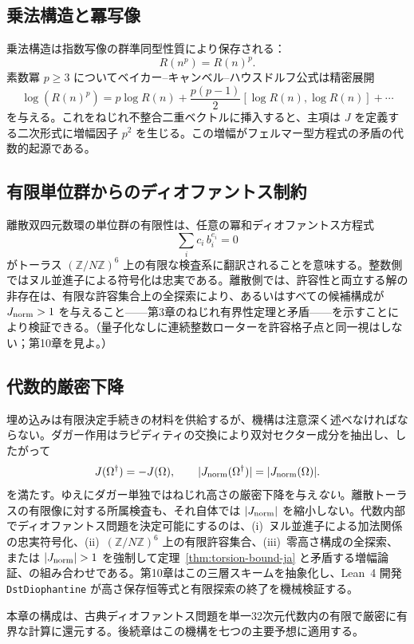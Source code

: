 \documentclass[dvipdfmx,a4paper]{article}
\theoremstyle{definition}
\theoremstyle{remark}
\newcommand{\Jnorm}{J_{\rm norm}}
\begin{document}
\subsection{乗法構造と冪写像}

乗法構造は指数写像の群準同型性質により保存される：
\[
R(n^p) = R(n)^p.
\]
素数冪 $p \geq 3$ についてベイカー--キャンベル--ハウスドルフ公式は精密展開
\[
\log(R(n)^p) = p \log R(n) + \frac{p(p-1)}{2} [\log R(n), \log R(n)] + \cdots
\]
を与える。これをねじれ不整合二重ベクトルに挿入すると、主項は $J$ を定義する二次形式に増幅因子 $p^2$ を生じる。この増幅がフェルマー型方程式の矛盾の代数的起源である。

\subsection{有限単位群からのディオファントス制約}

離散双四元数環の単位群の有限性は、任意の冪和ディオファントス方程式
\[
\sum_i c_i\, b_i^{e_i} = 0
\]
がトーラス $(\mathbb{Z}/N\mathbb{Z})^6$ 上の有限な検査系に翻訳されることを意味する。整数側ではヌル並進子による符号化は忠実である。離散側では、許容性と両立する解の非存在は、有限な許容集合上の全探索により、あるいはすべての候補構成が $\Jnorm > 1$ を与えること——第3章のねじれ有界性定理と矛盾——を示すことにより検証できる。（量子化なしに連続整数ローターを許容格子点と同一視はしない；第10章を見よ。）


\subsection{代数的厳密下降}

\label{sec:ch4-descent-ja}
埋め込みは有限決定手続きの材料を供給するが、機構は注意深く述べなければならない。ダガー作用はラピディティの交換により双対セクター成分を抽出し、したがって
\[
J(\Omega^\dagger)=-J(\Omega),\qquad |\Jnorm(\Omega^\dagger)|=|\Jnorm(\Omega)|.
\]
を満たす。ゆえにダガー単独ではねじれ高さの厳密下降を与え\emph{ない}。離散トーラスの有限像に対する所属検査も、それ自体では $|\Jnorm|$ を縮小しない。代数内部でディオファントス問題を決定可能にするのは、(i)~ヌル並進子による加法関係の忠実符号化、(ii)~$(\mathbb{Z}/N\mathbb{Z})^6$ 上の有限許容集合、(iii)~零高さ構成の全探索、または $|\Jnorm|>1$ を強制して定理~\ref{thm:torsion-bound-ja} と矛盾する増幅論証、の組み合わせである。第10章はこの三層スキームを抽象化し、Lean~4 開発 \texttt{DstDiophantine} が高さ保存恒等式と有限探索の終了を機械検証する。

本章の構成は、古典ディオファントス問題を単一32次元代数内の有限で厳密に有界な計算に還元する。後続章はこの機構を七つの主要予想に適用する。
\end{document}
